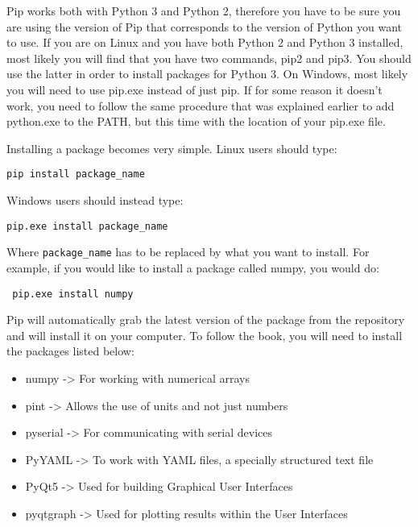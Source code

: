 Pip works both with Python 3 and Python 2, therefore you have to be sure you are using the version of Pip that corresponds to the version of Python you want to use. If you are on Linux and you have both Python 2 and Python 3 installed, most likely you will find that you have two commands, pip2 and pip3. You should use the latter in order to install packages for Python 3. On Windows, most likely you will need to use pip.exe instead of just pip. If for some reason it doesn't work, you need to follow the same procedure that was explained earlier to add python.exe to the PATH, but this time with the location of your pip.exe file.

Installing a package becomes very simple. Linux users should type:
\begin{verbatim}
pip install package_name
\end{verbatim}

Windows users should instead type:
\begin{verbatim}
pip.exe install package_name
\end{verbatim}

Where \texttt{package_name} has to be replaced by what you want to install. For example, if you would like to install a package called numpy, you would do:
\begin{verbatim}
 pip.exe install numpy
\end{verbatim}


Pip will automatically grab the latest version of the package from the repository and will install it on your computer. To follow the book, you will need to install the packages listed below:
\begin{itemize}
 \item numpy -> For working with numerical arrays
 \item pint -> Allows the use of units and not just numbers
 \item pyserial -> For communicating with serial devices
 \item PyYAML -> To work with YAML files, a specially structured text file
 \item PyQt5 -> Used for building Graphical User Interfaces
 \item pyqtgraph -> Used for plotting results within the User Interfaces
\end{itemize}


